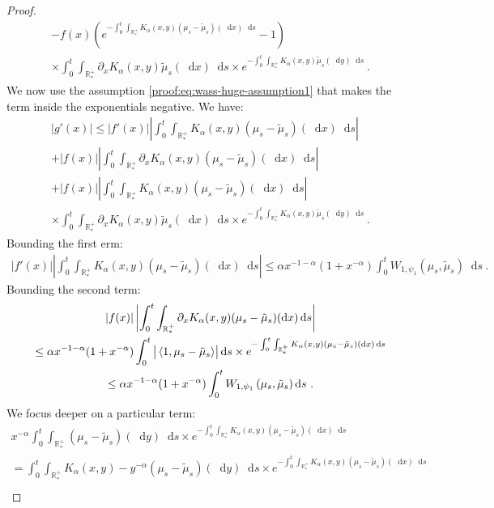 \documentclass[11pt,a4paper]{article}
\newcommand{\RRP}{\mathbb{R}^+_*}
\newcommand{\brac}[1]{\left\langle#1\right\rangle}
\newcommand{\dd}{\mathop{}\!\mathrm{d}}
\begin{document}
\begin{proof}
\begin{multline*}
            - f(x) \left(e^{-\int_0^t \int_{\RRP} K_\alpha(x,y) (\mu_s-\tilde{\mu}_s)(\dd x)\dd s} - 1\right)\\
            \times  \int_0^t \int_{\RRP} \partial_x K_\alpha(x,y) \tilde{\mu}_s(\dd x)\dd s \times e^{-\int_0^t \int_{\RRP} K_\alpha(x,y)\tilde{\mu}_s(\dd y) \dd s}\ .
    \end{multline*}
    We now use the assumption \eqref{proof:eq:wass-huge-assumption1} that makes the term inside the exponentials negative. We have:
    \begin{multline*}
        |g'(x)| \leq |f'(x)|\left|\int_0^t \int_{\RRP} K_\alpha(x,y) (\mu_s-\tilde{\mu}_s)(\dd x)\dd s\right|\\
        + |f(x)| \left|\int_0^t \int_{\RRP} \partial_x K_\alpha(x,y) (\mu_s-\tilde{\mu}_s)(\dd x)\dd s\right|\\
        + |f(x)| \left|\int_0^t \int_{\RRP} K_\alpha(x,y) (\mu_s-\tilde{\mu}_s)(\dd x)\dd s\right|\\
        \times  \int_0^t \int_{\RRP} \partial_x K_\alpha(x,y) \tilde{\mu}_s(\dd x)\dd s \times e^{-\int_0^t \int_{\RRP} K_\alpha(x,y)\tilde{\mu}_s(\dd y) \dd s}\ .
    \end{multline*}
    Bounding the first erm:
    \begin{align*}
        |f'(x)|\left|\int_0^t \int_{\RRP} K_\alpha(x,y) (\mu_s-\tilde{\mu}_s)(\dd x)\dd s\right|
        \leq \alpha x^{-1-\alpha} (1 + x^{-\alpha })\int_0^t  W_{1,\psi_1}(\mu_s,\tilde{\mu}_s)\dd s\ .
    \end{align*}
    Bounding the second term:
    \begin{multline*}
        |f(x)| \left|\int_0^t \int_{\RRP} \partial_x K_\alpha(x,y) (\mu_s-\tilde{\mu}_s)(\dd x)\dd s\right| \\
        \leq \alpha x^{-1-\alpha}(1  + x^{-\alpha}) \int_0^t \left|\vphantom{A^2}\brac{1,\mu_s-\tilde{\mu}_s} \right|\dd s \times e^{-\int_0^t \int_{\RRP} K_\alpha(x,y) (\mu_s-\tilde{\mu}_s)(\dd x)\dd s}\\
        \leq \alpha x^{-1-\alpha} (1  + x^{-\alpha}) \int_0^t W_{1,\psi_1}\left(\mu_s, \tilde{\mu}_s \right) \dd s\ .
    \end{multline*}
    We focus deeper on a particular term:
    \begin{multline*}
        x^{-\alpha}\int_0^t \int_{\RRP } (\mu_s-\tilde{\mu}_s)(\dd y) \dd s\times  e^{-\int_0^t \int_{\RRP} K_\alpha(x,y) (\mu_s-\tilde{\mu}_s)(\dd x)\dd s}\\
        = \int_0^t \int_{\RRP } K_\alpha(x,y) - y^{-\alpha} (\mu_s-\tilde{\mu}_s)(\dd y) \dd s\times  e^{-\int_0^t \int_{\RRP} K_\alpha(x,y) (\mu_s-\tilde{\mu}_s)(\dd x)\dd s}\\

\end{multline*}
\end{proof}
\end{document}
